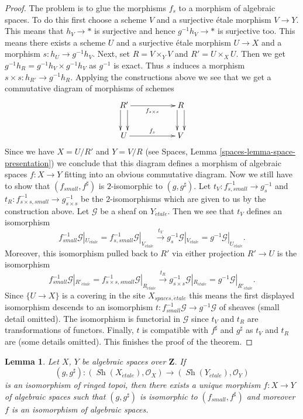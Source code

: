 \documentclass{stacks-project}
\theoremstyle{plain}
\newtheorem{lemma}[subsection]{Lemma}
\theoremstyle{definition}
\theoremstyle{remark}
\numberwithin{equation}{subsection}
\def\Sh{\mathop{\mathit{Sh}}\nolimits}
\def\etale{{\acute{e}tale}}
\begin{document}
\begin{proof}
\medskip\noindent
The problem is to glue the morphisms $f_s$ to a morphism of algebraic
spaces. To do this first choose a scheme $V$ and a surjective \'etale
morphism $V \to Y$. This means that $h_V \to *$ is surjective and hence
$g^{-1}h_V \to *$ is surjective too. This means there exists a scheme $U$
and a surjective \'etale morphism $U \to X$ and a morphism
$s : h_U \to g^{-1}h_V$. Next, set $R = V \times_Y V$ and
$R' = U \times_X U$. Then we get
$g^{-1}h_R = g^{-1}h_V \times g^{-1}h_V$ as $g^{-1}$ is exact.
Thus $s$ induces a morphism $s \times s : h_{R'} \to g^{-1}h_R$.
Applying the constructions above we see that we get a
commutative diagram of morphisms of schemes
$$
\xymatrix{
R' \ar@<1ex>[d] \ar@<-1ex>[d] \ar[rr]_{f_{s \times s}} & &
R \ar@<1ex>[d] \ar@<-1ex>[d] \\
U \ar[rr]^{f_s} & &
V
}
$$
Since we have $X = U/R'$ and $Y = V/R$ (see
Spaces, Lemma \ref{spaces-lemma-space-presentation})
we conclude that this diagram
defines a morphism of algebraic spaces $f : X \to Y$ fitting
into an obvious commutative diagram.
Now we still have to show that $(f_{small}, f^\sharp)$ is
$2$-isomorphic to $(g, g^\sharp)$.
Let $t_V : f_{s, small}^{-1} \to g_s^{-1}$ and
$t_R : f_{s \times s, small}^{-1} \to g_{s \times s}^{-1}$ be
the $2$-isomorphisms which are given to us by the construction above.
Let $\mathcal{G}$ be a sheaf on $Y_\etale$. Then we see that
$t_V$ defines an isomorphism
$$
f_{small}^{-1}\mathcal{G}|_{U_\etale}
=
f_{s, small}^{-1}\mathcal{G}|_{V_\etale}
\xrightarrow{t_V}
g_s^{-1}\mathcal{G}|_{V_\etale}
=
g^{-1}\mathcal{G}|_{U_\etale}.
$$
Moreover, this isomorphism pulled back to $R'$ via either projection
$R' \to U$ is the isomorphism
$$
f_{small}^{-1}\mathcal{G}|_{R'_\etale}
=
f_{s \times s, small}^{-1}\mathcal{G}|_{R_\etale}
\xrightarrow{t_R}
g_{s \times s}^{-1}\mathcal{G}|_{R_\etale}
=
g^{-1}\mathcal{G}|_{R'_\etale}.
$$
Since $\{U \to X\}$ is a covering in the site $X_{spaces, \etale}$
this means the first displayed isomorphism descends to an isomorphism
$t : f_{small}^{-1}\mathcal{G} \to g^{-1}\mathcal{G}$
of sheaves (small detail omitted). The isomorphism is functorial
in $\mathcal{G}$ since $t_V$ and $t_R$ are transformations of functors.
Finally, $t$ is compatible with $f^\sharp$ and $g^\sharp$ as
$t_V$ and $t_R$ are (some details omitted).
This finishes the proof of the theorem.
\end{proof}

\begin{lemma}
\label{lemma-isomorphism-ringed-topoi}
Let $X$, $Y$ be algebraic spaces over $\mathbf{Z}$. If
$$
(g, g^\sharp) :
(\Sh(X_\etale), \mathcal{O}_X)
\longrightarrow
(\Sh(Y_\etale), \mathcal{O}_Y)
$$
is an isomorphism of ringed topoi, then there exists a unique
morphism $f : X \to Y$ of algebraic spaces such that
$(g, g^\sharp)$ is isomorphic to $(f_{small}, f^\sharp)$
and moreover $f$ is an isomorphism of algebraic spaces.
\end{lemma}
\end{document}
